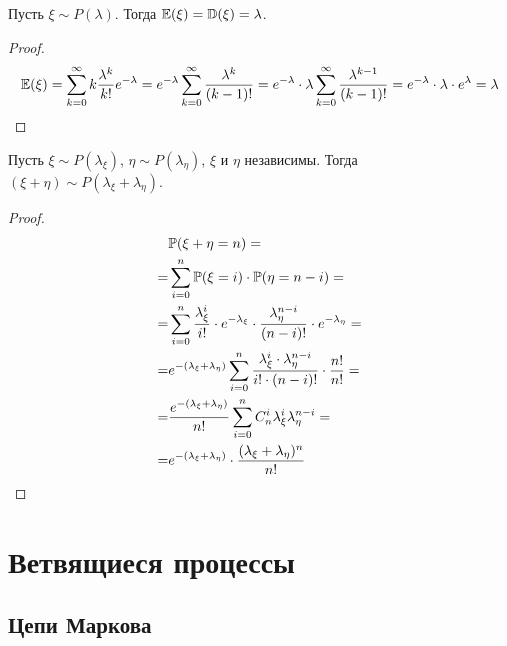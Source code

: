 \documentclass[12pt]{article}
\begin{document}
\begin{theorem}
    Пусть $\xi\sim P(\lambda)$. Тогда $\mathbb{E}(\xi)=\mathbb{D}(\xi)=\lambda$.
\end{theorem}
\begin{proof}
    $$\mathbb{E}(\xi)=\sum_{k=0}^{\infty}k\dfrac{\lambda^k}{k!}e^{-\lambda}=e^{-\lambda}\sum_{k=0}^{\infty}\dfrac{\lambda^k}{(k-1)!}=e^{-\lambda}\cdot\lambda\sum_{k=0}^{\infty}\dfrac{\lambda^{k-1}}{(k-1)!}=e^{-\lambda}\cdot\lambda\cdot e^\lambda=\lambda$$
\end{proof}
\begin{lemma}
    Пусть $\xi\sim P(\lambda_\xi)$, $\eta\sim P(\lambda_\eta)$, $\xi$ и $\eta$ независимы. Тогда $(\xi+\eta)\sim P(\lambda_\xi+\lambda_\eta)$.
\end{lemma}
\begin{proof}
    \begin{align*}
        &\mathbb{P}(\xi+\eta=n)=\\
        =&\sum_{i=0}^{n}\mathbb{P}(\xi=i)\cdot\mathbb{P}(\eta=n-i)=\\
        =&\sum_{i=0}^{n}\dfrac{\lambda_\xi^i}{i!}\cdot e^{-\lambda_\xi}\cdot \dfrac{\lambda_\eta^{n-i}}{(n-i)!}\cdot e^{-\lambda_\eta}=\\
        =&e^{-(\lambda_\xi+\lambda_\eta)}\sum_{i=0}^{n}\dfrac{\lambda_\xi^i\cdot\lambda_\eta^{n-i}}{i!\cdot(n-i)!}\cdot \dfrac{n!}{n!}=\\
        =&\dfrac{e^{-(\lambda_\xi+\lambda_\eta)}}{n!}\sum_{i=0}^{n}C_n^i\lambda_\xi^i\lambda_\eta^{n-i}=\\
        =&e^{-(\lambda_\xi+\lambda_\eta)}\cdot \dfrac{(\lambda_\xi+\lambda_\eta)^n}{n!}
    \end{align*}
\end{proof}

\section{Ветвящиеся процессы}

\subsection{Цепи Маркова}
\end{document}
